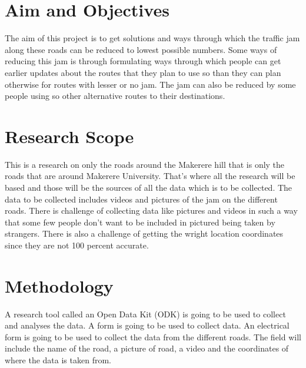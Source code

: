 \documentclass[options]{article}
\begin{document}
\section{\textbf{ Aim and Objectives}}
The aim of this project is to get solutions and ways through which the traffic jam along these roads can be reduced to lowest possible numbers.
Some ways of reducing this jam is through formulating ways through which people can get earlier updates about the routes that they plan to use so than they can plan otherwise for routes with lesser or no jam.
The jam can also be reduced by some people using so other alternative routes to their destinations.


\section {\textbf{Research Scope}}
This is a research on only the roads around the Makerere hill that is only the roads that are around Makerere University. That’s where all the research will be based and those will be the sources of all the data which is to be collected. 
The data to be collected includes videos and pictures of the jam on the different roads.
There is challenge of collecting data like pictures and videos in such a way that some few people don’t want to be included in pictured being taken by strangers.
There is also a challenge of getting the wright location coordinates since they are not 100 percent accurate.

\section {\textbf{Methodology}}
A research tool called an Open Data Kit (ODK) is going to be used to collect and analyses the data. A form is going to be used to collect data. An electrical form is going to be used to collect the data from the different roads. The field will include the name of the road, a picture of road, a video and the coordinates of where the data is taken from.
\end{document}
